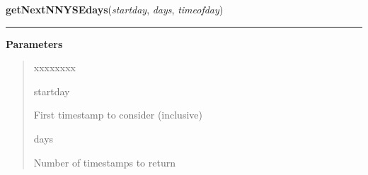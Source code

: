     \label{QSTK:qstkutil:dateutil:getNextNNYSEdays}

    \vspace{0.5ex}

\hspace{.8\funcindent}\begin{boxedminipage}{\funcwidth}

    \raggedright \textbf{getNextNNYSEdays}(\textit{startday}, \textit{days}, \textit{timeofday})

    \vspace{-1.5ex}

    \rule{\textwidth}{0.5\fboxrule}
\setlength{\parskip}{2ex}
\setlength{\parskip}{1ex}
      \textbf{Parameters}
      \vspace{-1ex}

      \begin{quote}
        \begin{Ventry}{xxxxxxxx}

          \item[startday]

          First timestamp to consider (inclusive)

          \item[days]

          Number of timestamps to return

        \end{Ventry}

      \end{quote}

    \end{boxedminipage}

    \label{QSTK:qstkutil:dateutil:getPrevNNYSEday}

    \vspace{0.5ex}

